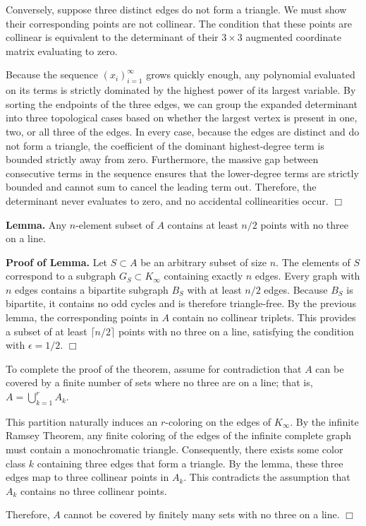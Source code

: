 Conversely, suppose three distinct edges do not form a triangle. We must show their corresponding points are not collinear. The condition that these points are collinear is equivalent to the determinant of their $3 \times 3$ augmented coordinate matrix evaluating to zero. 

Because the sequence $(x_i)_{i=1}^\infty$ grows quickly enough, any polynomial evaluated on its terms is strictly dominated by the highest power of its largest variable. By sorting the endpoints of the three edges, we can group the expanded determinant into three topological cases based on whether the largest vertex is present in one, two, or all three of the edges. In every case, because the edges are distinct and do not form a triangle, the coefficient of the dominant highest-degree term is bounded strictly away from zero. Furthermore, the massive gap between consecutive terms in the sequence ensures that the lower-degree terms are strictly bounded and cannot sum to cancel the leading term out. Therefore, the determinant never evaluates to zero, and no accidental collinearities occur. $\Box$

\textbf{Lemma.}
Any $n$-element subset of $A$ contains at least $n/2$ points with no three on a line.

\textbf{Proof of Lemma.}
Let $S \subset A$ be an arbitrary subset of size $n$. The elements of $S$ correspond to a subgraph $G_S \subset K_\infty$ containing exactly $n$ edges. Every graph with $n$ edges contains a bipartite subgraph $B_S$ with at least $n/2$ edges. Because $B_S$ is bipartite, it contains no odd cycles and is therefore triangle-free. By the previous lemma, the corresponding points in $A$ contain no collinear triplets. This provides a subset of at least $\lceil n/2 \rceil$ points with no three on a line, satisfying the condition with $\epsilon = 1/2$. $\Box$

To complete the proof of the theorem, assume for contradiction that $A$ can be covered by a finite number of sets where no three are on a line; that is, $A = \bigcup_{k=1}^r A_k$. 

This partition naturally induces an $r$-coloring on the edges of $K_\infty$. By the infinite Ramsey Theorem, any finite coloring of the edges of the infinite complete graph must contain a monochromatic triangle. Consequently, there exists some color class $k$ containing three edges that form a triangle. By the lemma, these three edges map to three collinear points in $A_k$. This contradicts the assumption that $A_k$ contains no three collinear points. 

Therefore, $A$ cannot be covered by finitely many sets with no three on a line. \hfill $\Box$